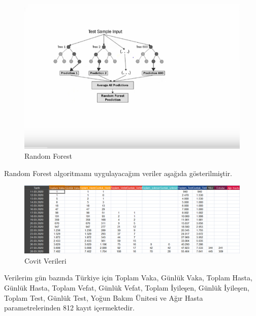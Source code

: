\documentclass[12pt, a4paper]{article}
\begin{document}
	
	\begin{figure}[!htbp] 
		\caption{ Random Forest }
		\centering
		\includegraphics[angle=0, width=\textwidth]{resim6.png}
		
	\end{figure} 
	
	
	
	
	\maketitle
	
	Random Forest algoritmamı uygulayacağım veriler aşağıda gösterilmiştir.
	\begin{figure}[!htbp] 
		\caption{Covit Verileri}
		\centering
		\includegraphics[angle=0, width=\textwidth]{4.0.png}
		
	\end{figure} 
	\newline
	Verilerim gün bazında Türkiye için Toplam Vaka, Günlük Vaka, Toplam Hasta, Günlük Hasta, Toplam Vefat, Günlük Vefat, Toplam İyileşen, Günlük İyileşen, Toplam Test, Günlük Test, Yoğun Bakım Ünitesi ve Ağır Hasta parametrelerinden 812 kayıt içermektedir.
	
\end{document}
